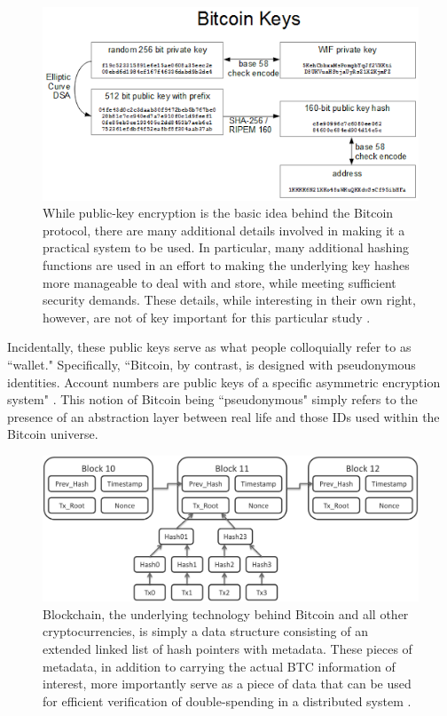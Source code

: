 \documentclass{article}
\begin{document}
\begin{figure}
    \label{fig:address}
    \centering
    \includegraphics[width=.75\textwidth]{address.png}
    \caption[Bitcoin Public-Key Wallets]{While public-key encryption is the basic idea behind the Bitcoin protocol, there are many additional details involved in making it a practical system to be used. In particular, many additional hashing functions are used in an effort to making the underlying key hashes more manageable to deal with and store, while meeting sufficient security demands. These details, while interesting in their own right, however, are not of key important for this particular study \cite{public-key}.}
\end{figure}

Incidentally, these public keys serve as what people colloquially refer to as ``wallet." Specifically, ``Bitcoin, by contrast, is designed with pseudonymous identities. Account numbers are public keys of a specific asymmetric encryption system" \cite{laundering}. This notion of Bitcoin being ``pseudonymous" simply refers to the presence of an abstraction layer between real life and those IDs used within the Bitcoin universe.

\begin{figure}
    \label{fig:blockchain}
    \centering
    \includegraphics[width=.75\textwidth]{blockchain.png}
    \caption[Blockchain Data Structure]{Blockchain, the underlying technology behind Bitcoin and all other cryptocurrencies, is simply a data structure consisting of an extended linked list of hash pointers with metadata. These pieces of metadata, in addition to carrying the actual BTC information of interest, more importantly serve as a piece of data that can be used for efficient verification of double-spending in a distributed system \cite{blockchain-img}.}
\end{figure}
\end{document}
